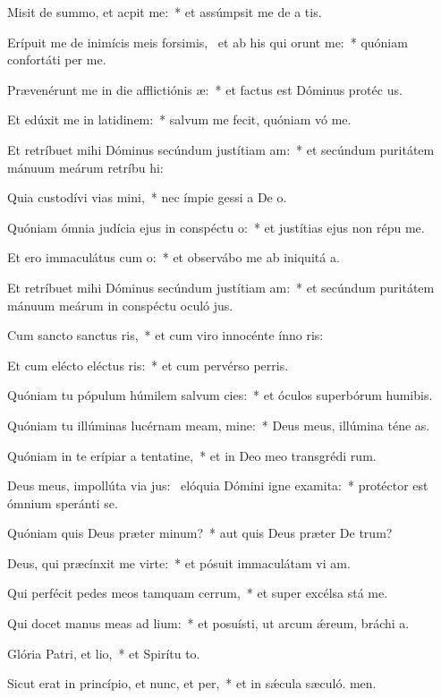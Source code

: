 \item Misit de summo, et acpit me:~* et assúmpsit me de a tis.
\item Erípuit me de inimícis meis forsimis,~\pscross{} et ab his qui orunt me:~* quóniam confortáti  per me.
\item Prævenérunt me in die afflictiónis æ:~* et factus est Dóminus protéc us.
\item Et edúxit me in latidinem:~* salvum me fecit, quóniam vó me.
\item Et retríbuet mihi Dóminus secúndum justítiam am:~* et secúndum puritátem mánuum meárum retríbu hi:
\item Quia custodívi vias mini,~* nec ímpie gessi a De o.
\item Quóniam ómnia judícia ejus in conspéctu o:~* et justítias ejus non répu  me.
\item Et ero immaculátus cum o:~* et observábo me ab iniquitá a.
\item Et retríbuet mihi Dóminus secúndum justítiam am:~* et secúndum puritátem mánuum meárum in conspéctu oculó jus.
\item Cum sancto sanctus ris,~* et cum viro innocénte ínno ris:
\item Et cum elécto eléctus ris:~* et cum pervérso perris.
\item Quóniam tu pópulum húmilem salvum cies:~* et óculos superbórum humibis.
\item Quóniam tu illúminas lucérnam meam, mine:~* Deus meus, illúmina téne as.
\item Quóniam in te erípiar a tentatine,~* et in Deo meo transgrédi rum.
\item Deus meus, impollúta via jus:~\pscross{} elóquia Dómini igne examita:~* protéctor est ómnium speránti  se.
\item Quóniam quis Deus præter minum?~* aut quis Deus præter De trum?
\item Deus, qui præcínxit me virte:~* et pósuit immaculátam vi am.
\item Qui perfécit pedes meos tamquam cerrum,~* et super excélsa stá me.
\item Qui docet manus meas ad lium:~* et posuísti, ut arcum ǽreum, bráchi a.
\item Glória Patri, et lio,~* et Spirítu to.
\item Sicut erat in princípio, et nunc, et per,~* et in sǽcula sæculó. men.
